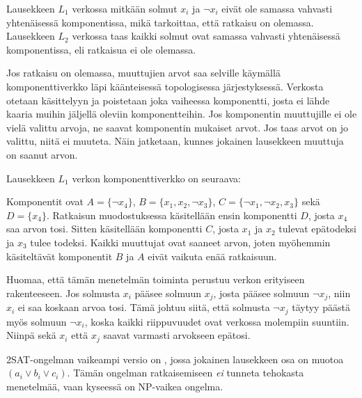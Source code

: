 Lausekkeen $L_1$ verkossa
mitkään solmut $x_i$ ja $\lnot x_i$
eivät ole samassa vahvasti yhtenäisessä komponentissa,
mikä tarkoittaa, että ratkaisu on olemassa.
Lausekkeen $L_2$ verkossa taas kaikki solmut
ovat samassa vahvasti yhtenäisessä komponentissa,
eli ratkaisua ei ole olemassa.

Jos ratkaisu on olemassa, muuttujien arvot saa selville
käymällä komponenttiverkko läpi käänteisessä
topologisessa järjestyksessä.
Verkosta otetaan käsittelyyn ja poistetaan
joka vaiheessa komponentti,
josta ei lähde kaaria muihin jäljellä
oleviin komponentteihin.
Jos komponentin muuttujille ei ole vielä valittu arvoja,
ne saavat komponentin mukaiset arvot.
Jos taas arvot on jo valittu, niitä ei muuteta.
Näin jatketaan, kunnes jokainen lausekkeen muuttuja on saanut arvon.

Lausekkeen $L_1$ verkon komponenttiverkko on seuraava:
\begin{center}
\end{center}

Komponentit ovat
$A = \{\lnot x_4\}$,
$B = \{x_1, x_2, \lnot x_3\}$,
$C = \{\lnot x_1, \lnot x_2, x_3\}$ sekä
$D = \{x_4\}$.
Ratkaisun muodostuksessa
käsitellään ensin komponentti $D$,
josta $x_4$ saa arvon tosi.
Sitten käsitellään komponentti $C$,
josta $x_1$ ja $x_2$ tulevat epätodeksi
ja $x_3$ tulee todeksi.
Kaikki muuttujat ovat saaneet arvon,
joten myöhemmin käsiteltävät
komponentit $B$ ja $A$ eivät vaikuta enää ratkaisuun.

Huomaa, että tämän menetelmän toiminta
perustuu verkon erityiseen rakenteeseen.
Jos solmusta $x_i$ pääsee
solmuun $x_j$,
josta pääsee solmuun $\lnot x_j$,
niin $x_i$ ei saa koskaan arvoa tosi.
Tämä johtuu siitä, että
solmusta $\lnot x_j$ täytyy
päästä myös solmuun $\lnot x_i$,
koska kaikki riippuvuudet
ovat verkossa molempiin suuntiin.
Niinpä sekä $x_i$ että $x_j$
saavat varmasti arvokseen epätosi.


2SAT-ongelman vaikeampi versio on ,
jossa jokainen lausekkeen osa on muotoa
$(a_i \lor b_i \lor c_i)$.
Tämän ongelman ratkaisemiseen \textit{ei}
tunneta tehokasta menetelmää,
vaan kyseessä on NP-vaikea ongelma.




